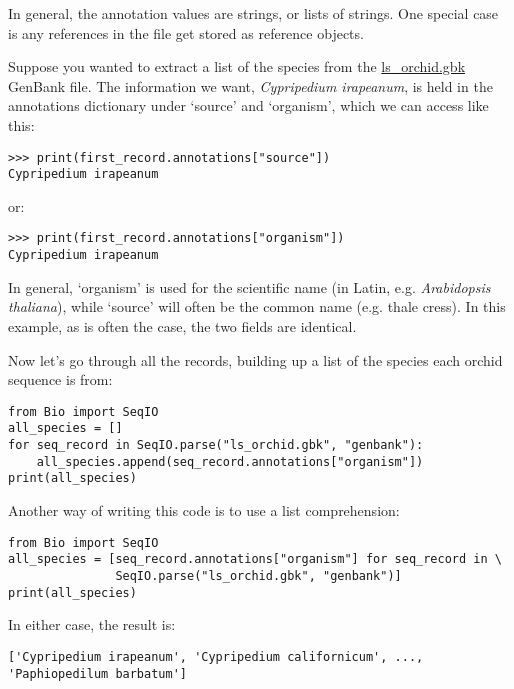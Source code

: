 In general, the annotation values are strings, or lists of strings.  One special case is any references in the file get stored as reference objects.

Suppose you wanted to extract a list of the species from the \href{https://raw.githubusercontent.com/biopython/biopython/master/Doc/examples/ls_orchid.gbk}{ls\_orchid.gbk} GenBank file.  The information we want, \emph{Cypripedium irapeanum}, is held in the annotations dictionary under `source' and `organism', which we can access like this:

\begin{verbatim}
>>> print(first_record.annotations["source"])
Cypripedium irapeanum
\end{verbatim}

\noindent or:

\begin{verbatim}
>>> print(first_record.annotations["organism"])
Cypripedium irapeanum
\end{verbatim}

In general, `organism' is used for the scientific name (in Latin, e.g. \textit{Arabidopsis thaliana}),
while `source' will often be the common name (e.g. thale cress).  In this example, as is often the case,
the two fields are identical.

Now let's go through all the records, building up a list of the species each orchid sequence is from:

\begin{verbatim}
from Bio import SeqIO
all_species = []
for seq_record in SeqIO.parse("ls_orchid.gbk", "genbank"):
    all_species.append(seq_record.annotations["organism"])
print(all_species)
\end{verbatim}

Another way of writing this code is to use a list comprehension:

\begin{verbatim}
from Bio import SeqIO
all_species = [seq_record.annotations["organism"] for seq_record in \
               SeqIO.parse("ls_orchid.gbk", "genbank")]
print(all_species)
\end{verbatim}

\noindent In either case, the result is:

\begin{verbatim}
['Cypripedium irapeanum', 'Cypripedium californicum', ..., 'Paphiopedilum barbatum']
\end{verbatim}

